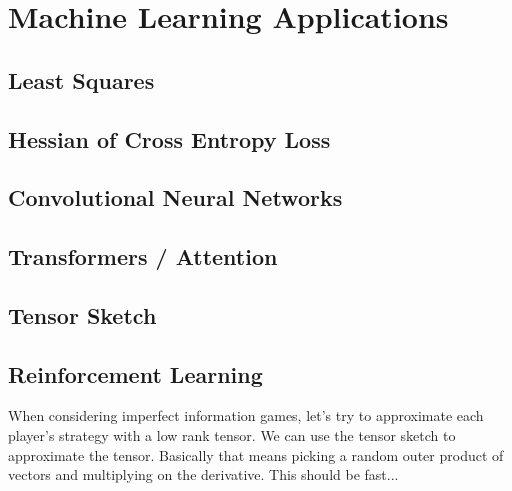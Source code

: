 
\chapter{Machine Learning Applications}

\section{Least Squares}

\section{Hessian of Cross Entropy Loss}

\section{Convolutional Neural Networks}

\section{Transformers / Attention}

\section{Tensor Sketch}

\section{Reinforcement Learning}

When considering imperfect information games,
let's try to approximate each player's strategy with a low rank tensor.
We can use the tensor sketch to approximate the tensor.
Basically that means picking a random outer product of vectors and multiplying on the derivative.
This should be fast...

